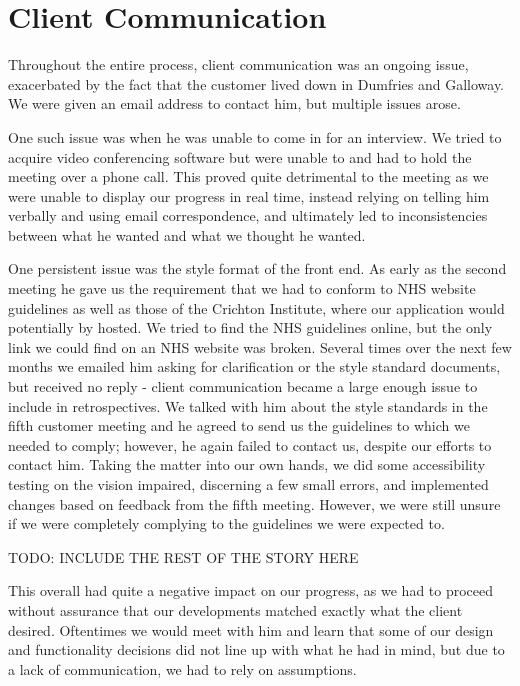 \documentclass{l3proj}
\begin{document}
\section{Client Communication}
\label{communication}

Throughout the entire process, client communication was an ongoing issue, exacerbated by the fact that the customer lived down in Dumfries and Galloway. We were given an email address to contact him, but multiple issues arose.

One such issue was when he was unable to come in for an interview. We tried to acquire video conferencing software but were unable to and had to hold the meeting over a phone call. This proved quite detrimental to the meeting as we were unable to display our progress in real time, instead relying on telling him verbally and using email correspondence, and ultimately led to inconsistencies between what he wanted and what we thought he wanted.

One persistent issue was the style format of the front end. As early as the second meeting he gave us the requirement that we had to conform to NHS website guidelines as well as those of the Crichton Institute, where our application would potentially by hosted. We tried to find the NHS guidelines online, but the only link we could find on an NHS website was broken. Several times over the next few months we emailed him asking for clarification or the style standard documents, but received no reply - client communication became a large enough issue to include in retrospectives. We talked with him about the style standards in the fifth customer meeting and he agreed to send us the guidelines to which we needed to comply; however, he again failed to contact us, despite our efforts to contact him. Taking the matter into our own hands, we did some accessibility testing on the vision impaired, discerning a few small errors, and implemented changes based on feedback from the fifth meeting. However, we were still unsure if we were completely complying to the guidelines we were expected to.

TODO: INCLUDE THE REST OF THE STORY HERE

This overall had quite a negative impact on our progress, as we had to proceed without assurance that our developments matched exactly what the client desired. Oftentimes we would meet with him and learn that some of our design and functionality decisions did not line up with what he had in mind, but due to a lack of communication, we had to rely on assumptions.
\end{document}
